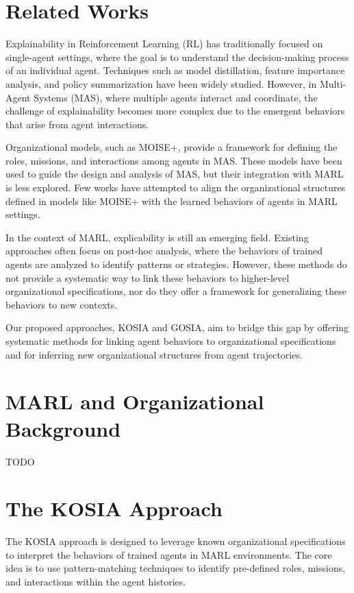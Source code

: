 \documentclass[sn-mathphys-num]{sn-jnl}%
\theoremstyle{thmstyleone}%
\theoremstyle{thmstyletwo}%
\theoremstyle{thmstylethree}%
\begin{document}
\section{Related Works}
\label{sec:related}

Explainability in Reinforcement Learning (RL) has traditionally focused on single-agent settings, where the goal is to understand the decision-making process of an individual agent. Techniques such as model distillation, feature importance analysis, and policy summarization have been widely studied. However, in Multi-Agent Systems (MAS), where multiple agents interact and coordinate, the challenge of explainability becomes more complex due to the emergent behaviors that arise from agent interactions.

Organizational models, such as MOISE+, provide a framework for defining the roles, missions, and interactions among agents in MAS. These models have been used to guide the design and analysis of MAS, but their integration with MARL is less explored. Few works have attempted to align the organizational structures defined in models like MOISE+ with the learned behaviors of agents in MARL settings.

In the context of MARL, explicability is still an emerging field. Existing approaches often focus on post-hoc analysis, where the behaviors of trained agents are analyzed to identify patterns or strategies. However, these methods do not provide a systematic way to link these behaviors to higher-level organizational specifications, nor do they offer a framework for generalizing these behaviors to new contexts.

Our proposed approaches, KOSIA and GOSIA, aim to bridge this gap by offering systematic methods for linking agent behaviors to organizational specifications and for inferring new organizational structures from agent trajectories.

\section{MARL and Organizational Background}\label{sec:background}
TODO

\section{The KOSIA Approach}
\label{sec:kosia}

The KOSIA approach is designed to leverage known organizational specifications to interpret the behaviors of trained agents in MARL environments. The core idea is to use pattern-matching techniques to identify pre-defined roles, missions, and interactions within the agent histories.
\end{document}
